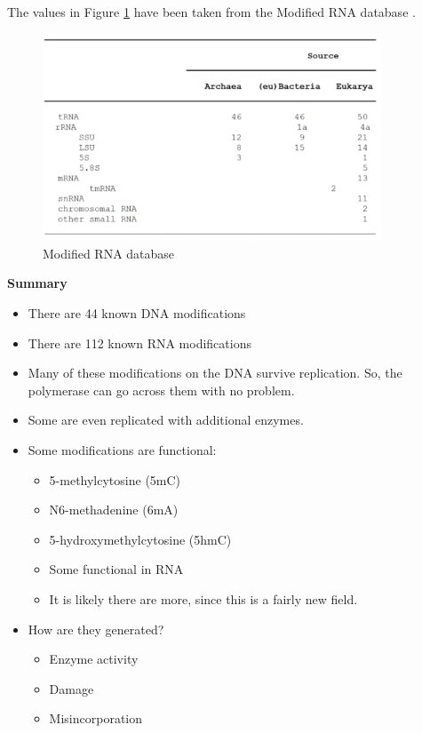 \documentclass[]{article}
\begin{document}
The values in Figure \ref{fig:ModifiedRNAdatabase} have been taken from the Modified RNA database \cite{agriss2019RNA}.

\begin{figure}[H]
	\caption{Modified RNA database} \label{fig:ModifiedRNAdatabase} 
	\includegraphics[width=0.9\textwidth]{ModifiedRNAdatabase}
\end{figure}

\textbf{Summary}

\begin{itemize}
	\item There are 44 known DNA modifications
	\item There are 112 known RNA modifications
	\item Many of these modifications on the DNA
	survive replication. So, the polymerase can go across them
	with no problem.
	\item Some are even replicated
	with additional enzymes.
	\item Some modifications are functional:\begin{itemize}
		\item 5-methylcytosine (5mC)
		\item N6-methadenine (6mA)
		\item 5-hydroxymethylcytosine (5hmC)
		\item Some functional in RNA
		\item It is likely there are more, since this is a fairly new field.
	\end{itemize}
	\item How are they generated?
	\begin{itemize}
		\item Enzyme activity
		\item Damage
		\item Misincorporation
	\end{itemize}
\end{itemize}
\end{document}
